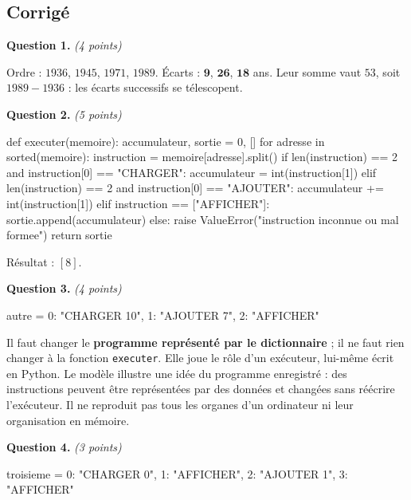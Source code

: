 \subsection*{Corrigé}

\textbf{Question 1.} \emph{(4 points)}

Ordre : $1936$, $1945$, $1971$, $1989$. Écarts : $\mathbf{9}$, $\mathbf{26}$,
$\mathbf{18}$ ans. Leur somme vaut $53$, soit $1989 - 1936$ : les écarts
successifs se télescopent.

\medskip
\textbf{Question 2.} \emph{(5 points)}

\begin{python}
def executer(memoire):
    accumulateur, sortie = 0, []
    for adresse in sorted(memoire):
        instruction = memoire[adresse].split()
        if len(instruction) == 2 and instruction[0] == "CHARGER":
            accumulateur = int(instruction[1])
        elif len(instruction) == 2 and instruction[0] == "AJOUTER":
            accumulateur += int(instruction[1])
        elif instruction == ["AFFICHER"]:
            sortie.append(accumulateur)
        else:
            raise ValueError("instruction inconnue ou mal formee")
    return sortie
\end{python}

Résultat : $[8]$.

\medskip
\textbf{Question 3.} \emph{(4 points)}

\begin{python}
autre = {0: "CHARGER 10", 1: "AJOUTER 7", 2: "AFFICHER"}
\end{python}

Il faut changer le \textbf{programme représenté par le dictionnaire} ; il ne
faut rien changer à la fonction \lstinline{executer}. Elle joue le rôle d'un
exécuteur, lui-même écrit en Python. Le modèle illustre une idée du programme
enregistré : des instructions peuvent être représentées par des données et
changées sans réécrire l'exécuteur. Il ne reproduit pas tous les organes d'un
ordinateur ni leur organisation en mémoire.

\medskip
\textbf{Question 4.} \emph{(3 points)}

\begin{python}
troisieme = {0: "CHARGER 0", 1: "AFFICHER", 2: "AJOUTER 1", 3: "AFFICHER"}
\end{python}

